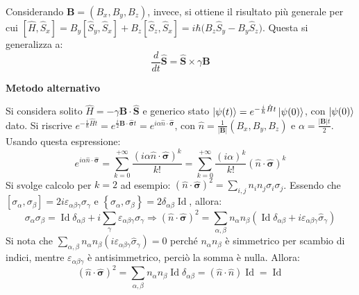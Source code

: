 \documentclass[11pt, a4paper]{scrartcl} %
\numberwithin{equation}{subsection}
\theoremstyle{style2}
\theoremstyle{style1}
\begin{document}
Considerando $\mathbf{B} = (B_x,B_y,B_z)$, invece, si ottiene il risultato pi\`u generale per cui $[\hat{H}, \hat{S}_x] = B_y [ \hat{S}_y , \hat{S}_x] + B_z [\hat{S}_z , \hat{S}_x] = i \hbar \big(B_z \hat{S}_y - B_y \hat{S}_z\big)$.
Questa si generalizza a:
\begin{equation}
	\frac{d }{d t} \hat{\mathbf{S} } = \hat{\mathbf{S} } \times  \gamma \mathbf{B} 
\end{equation}

\begin{center}
	\textbf{Metodo alternativo} 
\end{center}
Si considera solito $\hat{H } = - \gamma \mathbf{B} \cdot \hat{\mathbf{S} }$ e generico stato $\ket{\psi  (t) } = e^{ - \frac{i}{\hbar } \hat{H} t} \ket{\psi (0)} $, con $\ket{\psi(0) }$ dato.
Si riscrive $e^{- \frac{i}{\hbar }\hat{H}t}  = e^{\frac{i}{2}\mathbf{B} \cdot \hat{\pmb{\sigma  } } t} = e^{i \alpha  \hat{n}\cdot \hat{\pmb{\sigma } }}  $, con $\hat{n} = \frac{1}{\lvert \mathbf{B}  \rvert } (B_x , B_y , B_z)$ e $\alpha  = \frac{\lvert \mathbf{B}  \rvert t}{2}$.
Usando questa espressione:
\[
e^{i \alpha  \hat{n}\cdot \hat{\pmb{\sigma } }} = \sum_{k=0}^{+\infty} \frac{(i \alpha  \hat{n}\cdot  \hat{\pmb{\sigma } })^k}{k!} = \sum_{k=0}^{+\infty} \frac{(i\alpha )^k}{k!} (\hat{n}\cdot \hat{\pmb{\sigma } })^k
\] 
Si svolge calcolo per $k=2$ ad esempio: $(\hat{n}\cdot \hat{\pmb{\sigma } })^2 = \sum_{i,j}^{} n_i n_j \sigma _i \sigma _j$. Essendo che $[\sigma _\alpha , \sigma _\beta ] = 2 i \varepsilon _{\alpha \beta \gamma} \sigma _\gamma$ e $\left\{ \sigma _\alpha , \sigma _\beta  \right\} = 2\delta _{\alpha  \beta }  \operatorname{Id} $, allora:
	\begin{equation}
		\sigma _\alpha  \sigma _\beta  = \operatorname{Id} \delta _{\alpha \beta  } + i \sum_{\gamma}^{} \varepsilon _{\alpha  \beta  \gamma}  \sigma _\gamma \Rightarrow (\hat{n}\cdot \hat{\pmb{\sigma } })^2 = \sum_{\alpha ,\beta }^{} n_\alpha  n_\beta  ( \operatorname{Id} \delta _{\alpha  \beta } +i \varepsilon _{\alpha  \beta  \gamma} \hat{\sigma }_\gamma)
	\end{equation}
Si nota che $\sum_{\alpha ,\beta }^{} n_\alpha  n_\beta  (i \varepsilon _{\alpha  \beta  \gamma} \hat{\sigma }_\gamma) = 0$ perch\'e $n_\alpha  n_\beta $ \`e simmetrico per scambio di indici, mentre $\varepsilon _{\alpha  \beta  \gamma} $ \`e antisimmetrico, perci\`o la somma \`e nulla. Allora:
\begin{equation}
	(\hat{n}\cdot \hat{\pmb{\sigma } })^2 = \sum_{\alpha ,\beta }^{} n_\alpha  n_\beta  \operatorname{Id} \delta _{\alpha \beta } = (\hat{n}\cdot \hat{n}) \operatorname{Id} = \operatorname{Id} 
\end{equation}
\end{document}
